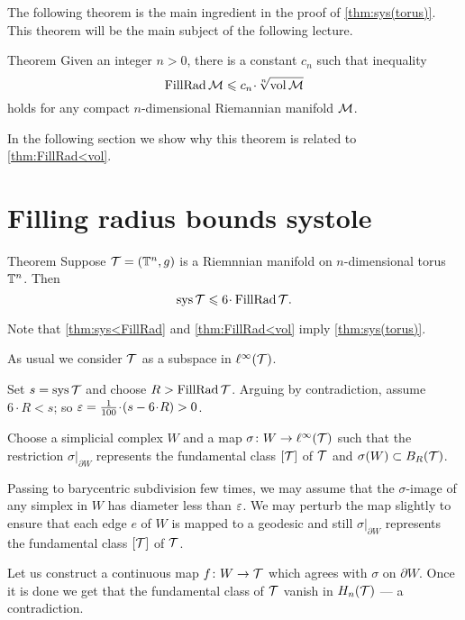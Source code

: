 \medskip

The following theorem is the main ingredient in the proof of \ref{thm:sys(torus)}.
This theorem will be the main subject of the following lecture.

\begin{thm}{Theorem}\label{thm:FillRad<vol}
Given an integer $n>0$, there is a constant $c_n$ such that inequality
\[\FillRad \spc{M}\le c_n\cdot \sqrt[n]{\vol \spc{M}}\]
holds for any compact $n$-dimensional Riemannian manifold $\mathcal{M}$.
\end{thm}

In the following section we show why this theorem is related to \ref{thm:FillRad<vol}.

\section{Filling radius bounds systole}

\begin{thm}{Theorem}\label{thm:sys<FillRad}
Suppose $\mathcal{T}= (\mathbb{T}^n,g)$ is a Riemnnian manifold on $n$-dimensional torus $\mathbb{T}^n$.
Then 
\[\sys\spc{T}\le 6 \cdot \FillRad \spc{T}.\]
\end{thm}

Note that \ref{thm:sys<FillRad} and \ref{thm:FillRad<vol}  imply \ref{thm:sys(torus)}.

As usual we consider $\mathcal{T}$ as a subspace in $\ell^\infty(\mathcal{T})$.

Set $s=\mathop{\rm sys}\nolimits\mathcal{T}$ and choose $R>\operatorname{\rm FillRad}\mathcal{T}$.
Arguing by contradiction, assume $6\cdot R< s$;
so $\eps=\tfrac1{100}\cdot(s-6\cdot R)>0$.

Choose a simplicial complex $W$ and a map $\sigma\colon W\to \ell^\infty(\mathcal{T})$ such that the restriction $\sigma|_{\partial W}$
represents the fundamental class $[\mathcal{T}]$ of $\mathcal{T}$
and $\sigma(W)\subset B_{R}(\mathcal{T})$.


Passing to barycentric subdivision few times, we may assume that the $\sigma$-image of any simplex in $W$ has diameter less than $\varepsilon$.
We may perturb the map slightly to ensure that each edge $e$ of $W$ is mapped to a geodesic and still $\sigma|_{\partial W}$
represents the fundamental class $[\mathcal{T}]$ of $\mathcal{T}$.

Let us construct a continuous map
$f\colon W\to  \mathcal{T}$ which agrees with $\sigma$ on $\partial W$.
Once it is done we get that the fundamental class of $\mathcal{T}$ vanish in $ H_n(\mathcal{T})$ --- a contradiction.

